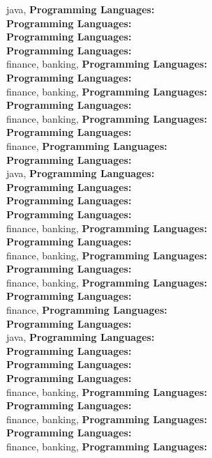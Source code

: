 java, \textbf{Programming Languages:} \\
\textbf{Programming Languages:} \\
\textbf{Programming Languages:} \\
\textbf{Programming Languages:} \\
finance, banking, \textbf{Programming Languages:} \\
\textbf{Programming Languages:} \\
finance, banking, \textbf{Programming Languages:} \\
\textbf{Programming Languages:} \\
finance, banking, \textbf{Programming Languages:} \\
\textbf{Programming Languages:} \\
finance, \textbf{Programming Languages:} \\
\textbf{Programming Languages:} \\
java, \textbf{Programming Languages:} \\
\textbf{Programming Languages:} \\
\textbf{Programming Languages:} \\
\textbf{Programming Languages:} \\
finance, banking, \textbf{Programming Languages:} \\
\textbf{Programming Languages:} \\
finance, banking, \textbf{Programming Languages:} \\
\textbf{Programming Languages:} \\
finance, banking, \textbf{Programming Languages:} \\
\textbf{Programming Languages:} \\
finance, \textbf{Programming Languages:} \\
\textbf{Programming Languages:} \\
java, \textbf{Programming Languages:} \\
\textbf{Programming Languages:} \\
\textbf{Programming Languages:} \\
\textbf{Programming Languages:} \\
finance, banking, \textbf{Programming Languages:} \\
\textbf{Programming Languages:} \\
finance, banking, \textbf{Programming Languages:} \\
\textbf{Programming Languages:} \\
finance, banking, \textbf{Programming Languages:} \\
